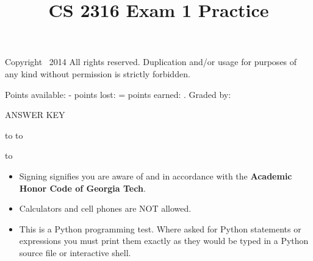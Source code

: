 \documentclass[answers,addpoints,9pt]{exam}
\title{CS 2316 Exam 1 Practice}
\date{}
\begin{document}
\maketitle
\thispagestyle{head}


\runningheader{}
              {\tiny Copyright \textcopyright\ 2014 All rights reserved. Duplication and/or usage for purposes of any kind without permission is strictly forbidden.}
              {}

              {}
              {Points available: \pointsonpage{\thepage} -
               points lost: \makebox[.5in]{\hrulefill} =
               points earned:  \makebox[.5in]{\hrulefill}.
              Graded by: \makebox[.5in]{\hrulefill}}


\ifprintanswers
\begin{center}
{\LARGE ANSWER KEY}
\end{center}
\else
\vspace{0.1in}
\hbox to \textwidth{Name (print clearly): \enspace\hrulefill}
\vspace{0.3in}
\hbox to \textwidth{Signature: \hrulefill}

\vspace{0.3in}
\hbox to \textwidth{GT account username (gtg, gth, msmith3, etc): \enspace\hrulefill}

\fi

\vfill

\begin{itemize}
\item Signing signifies you are aware of and in accordance with the {\bf Academic Honor Code of Georgia Tech}.
\item Calculators and cell phones are NOT allowed.
\item This is a Python programming test.  Where asked for Python statements or expressions you must print them exactly as they would be typed in a Python source file or interactive shell.
\end{itemize}

\vfill

\addpoints
\end{document}
